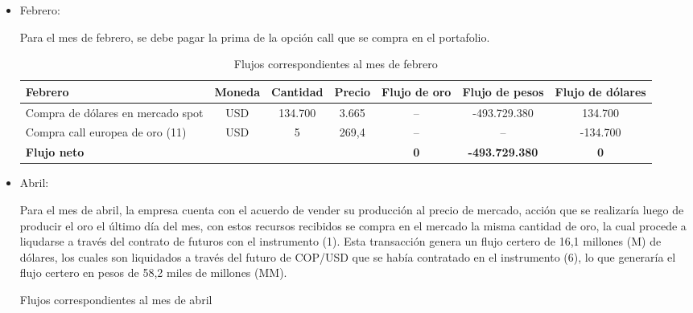\documentclass{article}
\theoremstyle{remark}
\theoremstyle{definition}
\begin{document}
 \begin{itemize}
     \item Febrero:

     Para el mes de febrero, se debe pagar la prima de la opción call que se compra en el portafolio.

\begin{table}[H]
\centering
\caption{Flujos correspondientes al mes de febrero}
\footnotesize
\renewcommand{\arraystretch}{1.2}

\begin{tabular}{l|c c c|c c c}
\toprule
\textbf{Febrero} & 
\textbf{Moneda} & 
\textbf{Cantidad} & 
\textbf{Precio} & 
\textbf{Flujo de oro} & 
\textbf{Flujo de pesos} & 
\textbf{Flujo de dólares} \\
\midrule

Compra de dólares en mercado spot 
& USD 
& 134.700 
& 3.665 
& -- 
& -493.729.380 
& 134.700 \\

Compra call europea de oro (11) 
& USD 
& 5\footnotemark
& 269,4 
& -- 
& -- 
& -134.700 \\

\midrule

\textbf{Flujo neto} 
&  
&  
&  
& \textbf{0} 
& \textbf{-493.729.380} 
& \textbf{0} \\

\bottomrule
\end{tabular}
\end{table}

\item Abril:

Para el mes de abril, la empresa cuenta con el acuerdo de vender su producción al precio de mercado, acción que se realizaría luego de producir el oro el último día del mes, con estos recursos recibidos se compra en el mercado la misma cantidad de oro, la cual procede a liqudarse a través del contrato de futuros con el instrumento (1). Esta transacción genera un flujo certero de 16,1 millones (M) de dólares, los cuales son liquidados a través del futuro de COP/USD que se había contratado en el instrumento (6), lo que generaría el flujo certero en pesos de 58,2 miles de millones (MM).

\begin{table}[H]
\centering
\caption{Flujos correspondientes al mes de abril}
\footnotesize
\renewcommand{\arraystretch}{1.2}


\end{table}
\end{itemize}
\end{document}
